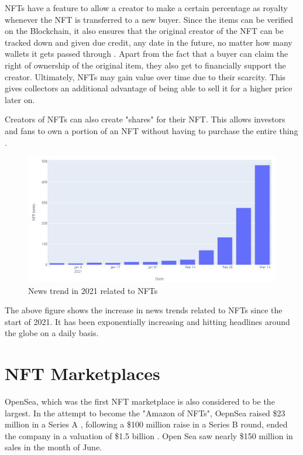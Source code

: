 \documentclass[a4paper, 12pt, oneside]{report}
\begin{document}
\bigbreak

NFTs have a feature to allow a creator to make a certain percentage as royalty whenever the NFT is transferred to a new buyer. Since the items can be verified on the Blockchain, it also ensures that the original creator of the NFT can be tracked down and given due credit, any date in the future, no matter how many wallets it gets passed through \autocite{chevet_blockchain_2018}. Apart from the fact that a buyer can claim the right of ownership of the original item, they also get to financially support the creator. Ultimately, NFTs may gain value over time due to their scarcity. This gives collectors an additional advantage of being able to sell it for a higher price later on.

Creators of NFTs can also create "shares" for their NFT. This allows investors and fans to own a portion of an NFT without having to purchase the entire thing \autocite{noauthor_erc-721_nodate}.


\begin{figure}[h!]
\centering
\includegraphics[width=12cm]{NFT-news-trends.png}
\caption{News trend in 2021 related to NFTs \autocite{dowling_fertile_2021}}
\end{figure}

The above figure shows the increase in news trends related to NFTs since the start of 2021. It has been exponentially increasing and hitting headlines around the globe on a daily basis.




\section{NFT Marketplaces}


OpenSea, which was the first NFT marketplace is also considered to be the largest. In the attempt to become the "Amazon of NFTs", OepnSea raised \$23 million in a Series A \autocite{hackett_this_2021}, following a \$100 million raise in a Series B round, ended the company in a valuation of \$1.5 billion \autocite{dfinzer_announcing_2021, matney_nft_2021}. Open Sea saw nearly \$150 million in sales in the month of June.
\end{document}
